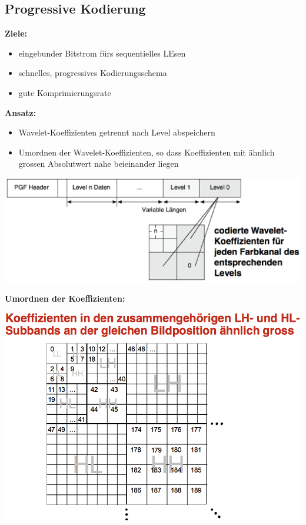\documentclass[10pt]{article}
\begin{document}
\subsection{Progressive Kodierung}
\textbf{Ziele:}
\begin{itemize}
	\item eingebunder Bitstrom fürs sequentielles LEsen
	\item schnelles, progressives Kodierungsschema
	\item gute Komprimierungsrate
\end{itemize}
\textbf{Ansatz:}
\begin{itemize}
	\item Wavelet-Koeffizienten getrennt nach Level abspeichern
	\item Umordnen der Wavelet-Koeffizienten, so dass Koeffizienten mit ähnlich grossen Absolutwert nahe beieinander liegen
\end{itemize}
\begin{center}
	\includegraphics[scale=0.2]{pgf-dateistruktur.png}
\end{center}
\textbf{Umordnen der Koeffizienten:}
\begin{center}
	\includegraphics[scale=0.3]{pgf-koeffizienten.png}
\end{center}
\end{document}
